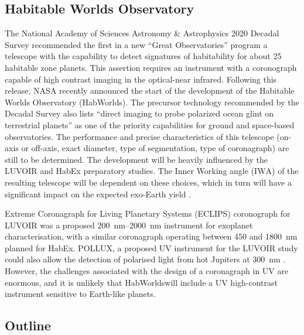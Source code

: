 \documentclass[
    usenatbib,
]{mnras}
\newcommand{\IWA}{\ensuremath{\mathrm{IWA}}}
\newcommand{\hwo}{HabWorlds}
\begin{document}
\subsection{Habitable Worlds Observatory}
The National Academy of Sciences Astronomy \& Astrophysics 2020 Decadal Survey \citep{decadal} recommended the first in a new \enquote{Great Observatories} program a telescope with the capability to detect signatures of habitability for about 25 habitable zone planets.
%
This assertion requires an instrument with a coronograph capable of high contrast imaging in the optical-near infrared.
%
Following this release, NASA recently announced the start of the development of the Habitable Worlds Observatory (\hwo).
%
The precursor technology recommended by the Decadal Survey also lists ``direct imaging to probe polarized ocean glint on terrestrial planets'' as one of the priority capabilities \citep[Box E.1 in][]{decadal} for ground and space-based observatories.
%
The performance and precise characteristics of this telescope (on-axis or off-axis, exact diameter, type of segmentation, type of coronagraph) are still to be determined.
%
The development will be heavily influenced by the LUVOIR \citep{LUVOIR2019} and HabEx \citep{HabEx_2020} preparatory studies.
%
The Inner Working angle (\IWA) of the resulting telescope will be dependent on these choices, which in turn will have a significant impact on the expected exo-Earth yield \citep{Stark2019_exoplanetyield}.

Extreme Coronagraph for Living Planetary Systems (ECLIPS) coronograph for LUVOIR was a proposed \SIrange{200}{2000}{\nano\meter} instrument for exoplanet characterisation, with a similar coronagraph operating between \num{450} and \SI{1800}{\nano\meter} planned for HabEx.
%
POLLUX, a proposed UV instrument for the LUVOIR study could also allow the detection of polarised light from hot Jupiters at \SI{300}{\nano\meter} \citep{Bouret2018_pollux}.
%
However, the challenges associated with the design of a coronagraph in UV are enormous, and it is unlikely that \hwo will include a UV high-contrast instrument sensitive to Earth-like planets.






\subsection{Outline}
\end{document}
